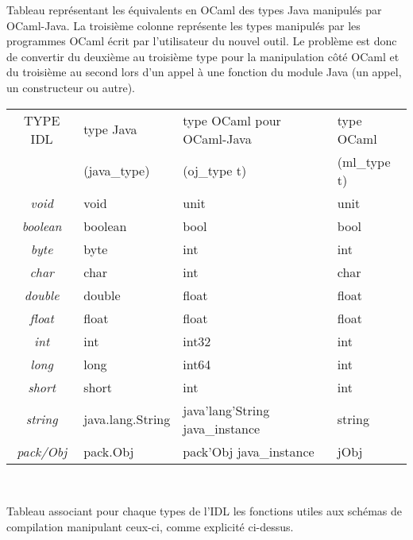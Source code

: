\documentclass[a4paper, 11pt, notitlepage]{article}
\begin{document}
Tableau représentant les équivalents en OCaml des types Java manipulés
par OCaml-Java.
La troisième colonne représente les types manipulés par les programmes
OCaml écrit par l'utilisateur du nouvel outil.
Le problème est donc de convertir du deuxième au troisième type pour la manipulation côté OCaml et du troisième au second lors d'un appel à une fonction du module Java (un appel, un constructeur ou autre).

\begin{tabular}{|c|l|l|l|}
 \hline
TYPE IDL &type Java & type OCaml  pour OCaml-Java & type OCaml \\
& (java\_type) & (oj\_type t) & (ml\_type t) \\
 \hline
\emph{void} & void & unit & unit\\
\emph{boolean} &boolean & bool & bool\\
\emph{byte} & byte & int & int \\
\emph{char} &char & int & char\\
\emph{double} & double & float & float\\
\emph{float} & float & float & float\\
\emph{int} & int & int32 & int\\
\emph{long} & long & int64 & int\\
\emph{short} & short & int & int\\
\emph{string} & java.lang.String & java'lang'String java\_instance & string\\
\emph{pack/Obj} & pack.Obj & pack'Obj java\_instance & jObj\\
 \hline
\end{tabular}
\
\newline

Tableau associant pour chaque types de l'IDL les
fonctions utiles aux schémas de compilation manipulant ceux-ci, comme explicité ci-dessus. 
\end{document}
